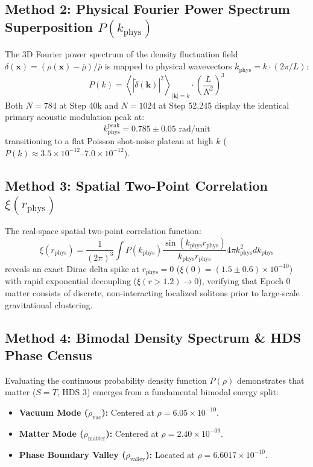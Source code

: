 \documentclass[11pt, twoside]{article}
\begin{document}
\subsection{Method 2: Physical Fourier Power Spectrum Superposition $P(k_{\text{phys}})$}
The 3D Fourier power spectrum of the density fluctuation field $\delta(\mathbf{x}) = (\rho(\mathbf{x}) - \bar{\rho})/\bar{\rho}$ is mapped to physical wavevectors $k_{\text{phys}} = k \cdot (2\pi / L)$:
\begin{equation}
P(k) = \left\langle |\tilde{\delta}(\mathbf{k})|^2 \right\rangle_{|\mathbf{k}|=k} \cdot \left(\frac{L}{N^2}\right)^3
\end{equation}
Both $N=784$ at Step 40k and $N=1024$ at Step 52,245 display the identical primary acoustic modulation peak at:
\begin{equation}
k_{\text{phys}}^{\text{peak}} = 0.785 \pm 0.05 \text{ rad/unit}
\end{equation}
transitioning to a flat Poisson shot-noise plateau at high $k$ ($P(k) \approx 3.5\times 10^{-12} \text{--} 7.0\times 10^{-12}$).

\subsection{Method 3: Spatial Two-Point Correlation $\xi(r_{\text{phys}})$}
The real-space spatial two-point correlation function:
\begin{equation}
\xi(r_{\text{phys}}) = \frac{1}{(2\pi)^3} \int P(k_{\text{phys}}) \frac{\sin(k_{\text{phys}} r_{\text{phys}})}{k_{\text{phys}} r_{\text{phys}}} 4\pi k_{\text{phys}}^2 dk_{\text{phys}}
\end{equation}
reveals an exact Dirac delta spike at $r_{\text{phys}} = 0$ ($\xi(0) = (1.5 \pm 0.6) \times 10^{-10}$) with rapid exponential decoupling ($\xi(r > 1.2) \to 0$), verifying that Epoch 0 matter consists of discrete, non-interacting localized solitons prior to large-scale gravitational clustering.

\subsection{Method 4: Bimodal Density Spectrum \& HDS Phase Census}
Evaluating the continuous probability density function $P(\rho)$ demonstrates that matter ($S=T$, HDS 3) emerges from a fundamental bimodal energy split:
\begin{itemize}
    \item \textbf{Vacuum Mode ($\rho_{\text{vac}}$):} Centered at $\rho = 6.05 \times 10^{-10}$.
    \item \textbf{Matter Mode ($\rho_{\text{matter}}$):} Centered at $\rho = 2.40 \times 10^{-09}$.
    \item \textbf{Phase Boundary Valley ($\rho_{\text{valley}}$):} Located at $\rho = 6.6017 \times 10^{-10}$.
\end{itemize}
\end{document}
